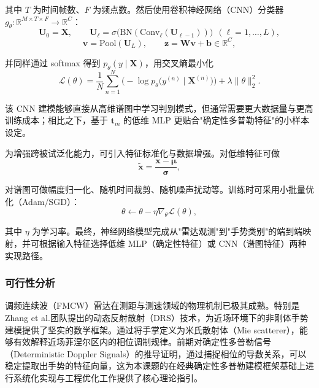 其中 $T$ 为时间帧数、$F$ 为频点数。然后使用卷积神经网络（CNN）分类器 $g_\theta:\mathbb{R}^{M\times T\times F}\to\mathbb{R}^{C}$：
\begin{equation}
\mathbf{U}_0=\mathbf{X},\qquad
\mathbf{U}_\ell=\sigma\!\big(\mathrm{BN}(\mathrm{Conv}_\ell(\mathbf{U}_{\ell-1}))\big)\ \ (\ell=1,\dots,L),
\end{equation}
\begin{equation}
\mathbf{v}=\mathrm{Pool}(\mathbf{U}_L),\qquad
\mathbf{z}=\mathbf{W}\mathbf{v}+\mathbf{b}\in\mathbb{R}^{C},
\end{equation}

并同样通过 softmax 得到 $p_\theta(y\mid\mathbf{X})$，用交叉熵最小化
\begin{equation}
\mathcal{L}(\theta)=\frac{1}{N}\sum_{n=1}^{N}\Big(-\log p_\theta\big(y^{(n)}\mid \mathbf{X}^{(n)}\big)\Big)+\lambda\|\theta\|_2^2.
\end{equation}

该 CNN 建模能够直接从高维谱图中学习判别模式，但通常需要更大数据量与更高训练成本；相比之下，基于 $\mathbf{t}_m$ 的低维 MLP 更贴合"确定性多普勒特征"的小样本设定。

为增强跨被试泛化能力，可引入特征标准化与数据增强。对低维特征可做
\begin{equation}
\tilde{\mathbf{x}}=\frac{\mathbf{x}-\boldsymbol{\mu}}{\boldsymbol{\sigma}},
\end{equation}

对谱图可做幅度归一化、随机时间裁剪、随机噪声扰动等。训练时可采用小批量优化（Adam\cite{kingma2017adammethodstochasticoptimization}/SGD\cite{li2023stochasticgradientdescentviewpoint}）：
\begin{equation}
\theta\leftarrow \theta-\eta\nabla_\theta \mathcal{L}(\theta),
\end{equation}

其中 $\eta$ 为学习率。最终，神经网络模型完成从"雷达观测"到"手势类别"的端到端映射，并可根据输入特征选择低维 MLP（确定性特征）或 CNN（谱图特征）两种实现路径。


\subsubsection{可行性分析}
调频连续波（FMCW）雷达在测距与测速领域的物理机制已极其成熟。特别是 Zhang et al.团队提出的动态反射散射（DRS）技术\cite{mainpaper}，为近场环境下的非刚体手势建模提供了坚实的数学框架。通过将手掌定义为米氏散射体（Mie scatterer），能够有效解释近场菲涅尔区内的相位调制规律。前期对确定性多普勒信号（Deterministic Doppler Signals）的推导证明，通过捕捉相位的导数关系，可以稳定提取出手势的特征向量，这为本课题的在经典确定性多普勒建模框架基础上进行系统化实现与工程优化工作提供了核心理论指引。

